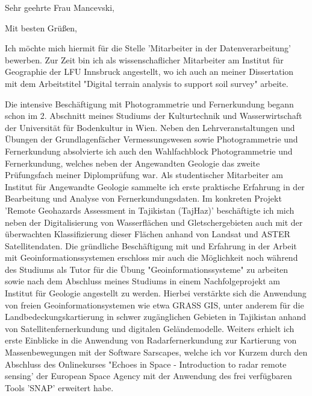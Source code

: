 \documentclass[11pt,a4paper,sans]{moderncv}        %
\begin{document}
\date{22. Nov, 2018}
\opening{Sehr geehrte Frau Mancevski,}
\closing{Mit besten Gr\"{u}{\ss}en,}
\makelettertitle
\justify
Ich m\"{o}chte mich hiermit f\"{u}r die Stelle 'Mitarbeiter in der Datenverarbeitung' bewerben. Zur Zeit bin ich als wissenschaflicher Mitarbeiter am Institut f\"{u}r Geographie der LFU Innsbruck angestellt, wo ich auch an meiner Dissertation mit dem Arbeitstitel "Digital terrain analysis to support soil survey" arbeite.

Die intensive Besch\"{a}ftigung mit Photogrammetrie und Fernerkundung begann schon im 2. Abschnitt meines Studiums der Kulturtechnik und Wasserwirtschaft der Universit\"{a}t f\"{u}r Bodenkultur in Wien. Neben den Lehrveranstaltungen und \"{U}bungen der Grundlagenf\"{a}cher Vermessungswesen sowie Photogrammetrie und Fernerkundung absolvierte ich auch den Wahlfachblock Photogrammetrie und Fernerkundung, welches neben der Angewandten Geologie das zweite Pr\"{u}fungsfach meiner Diplompr\"{u}fung war. Als studentischer Mitarbeiter am Institut f\"{u}r Angewandte Geologie sammelte ich erste praktische Erfahrung in der Bearbeitung und Analyse von Fernerkundungsdaten. Im konkreten Projekt 'Remote Geohazards Assessment in Tajikistan (TajHaz)' besch\"{a}ftigte ich mich neben der Digitalisierung von Wasserflächen und Gletschergebieten auch mit der überwachten Klassifizierung dieser Fl\"achen anhand von Landsat und ASTER Satellitendaten.  Die gr\"undliche Beschäftigung mit und Erfahrung in der Arbeit mit Geoinformationssystemen erschloss mir auch die Möglichkeit noch w\"ahrend des Studiums als Tutor f\"{u}r die \"{U}bung "Geoinformationssysteme" zu arbeiten sowie nach dem Abschluss meines Studiums in einem Nachfolgeprojekt am Institut f\"{u}r Geologie angestellt zu werden. Hierbei verstärkte sich die Anwendung von freien Geoinformationsystemen wie etwa GRASS GIS, unter anderem f\"{u}r die Landbedeckungskartierung in schwer zug\"anglichen Gebieten in Tajikistan anhand von Satellitenfernerkundung und digitalen Geländemodelle. Weiters erhielt ich erste Einblicke in die Anwendung von Radarfernerkundung zur Kartierung von Massenbewegungen mit der Software Sarscapes, welche ich vor Kurzem durch den Abschluss des Onlinekurses "Echoes in Space - Introduction to radar remote sensing' der European Space Agency mit der Anwendung des frei verfügbaren Tools 'SNAP' erweitert habe.
\end{document}
